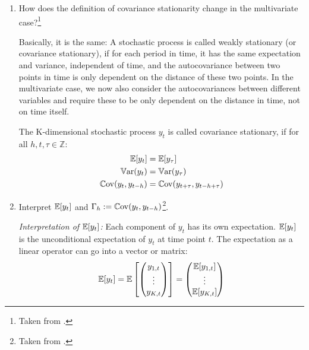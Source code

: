 \begin{enumerate}
    \item How does the definition of covariance stationarity change in the multivariate case?\footnote{Taken from \cite[][See section 16, "Understanding multivariate time series concepts"]{Mutschler-2018-github_repo}.}

          \begin{sol}
              Basically, it is the same: A stochastic process is called weakly stationary (or covariance stationary), if for each period in time, it has the same expectation and variance, independent of time, and the autocovariance between two points in time is only dependent on the distance of these two points. In the multivariate case, we now also consider the autocovariances between different variables and require these to be only dependent on the distance in time, not on time itself.

              \begin{definition}
                  The K-dimensional stochastic process $y_t$ is called covariance stationary, if for all $h,t,\tau \in \mathbb{Z}$:
                  \begin{align}
                      \operatorname*{\mathbb{E}}[{y_t}]
                       & = \operatorname*{\mathbb{E}}[{y_\tau}]
                      \\
                      \operatorname*{\mathbb{V}ar}(y_t) 
                      & = \operatorname*{\mathbb{V}ar}(y_\tau)
                      \\
                      \operatorname*{\mathbb{C}ov}(y_{t},y_{t-h})
                       & = \operatorname*{\mathbb{C}ov}(y_{t+\tau}, y_{t-h+\tau})
                  \end{align}
              \end{definition}
          \end{sol}

    \item Interpret $\operatorname*{\mathbb{E}}[y_t]$ and $\Gamma_h := \operatorname*{\mathbb{C}ov}(y_{t},y_{t-h})$\footnote{Taken from \cite[][See section 16, "Understanding multivariate time series concepts"]{Mutschler-2018-github_repo}.}.
          \begin{sol}
              \emph{Interpretation of $\operatorname*{\mathbb{E}}[y_t]$:} Each component of $y_t$ has its own expectation. $\operatorname*{\mathbb{E}}[y_t]$ is the unconditional expectation of $y_t$ at time point $t$. The expectation as a linear operator can go into a vector or matrix:
              \begin{align*}
                  \operatorname*{\mathbb{E}}[y_t]
                  = \operatorname*{\mathbb{E}}\left[
                      \begin{pmatrix}
                          y_{1,t} \cr \vdots \cr y_{K,t}
                      \end{pmatrix}
                      \right]
                  = \begin{pmatrix}
                        \operatorname*{\mathbb{E}}[y_{1,t}] \cr \vdots \cr \operatorname*{\mathbb{E}}[y_{K,t}]
                    \end{pmatrix}
              \end{align*}



\end{sol}
\end{enumerate}
